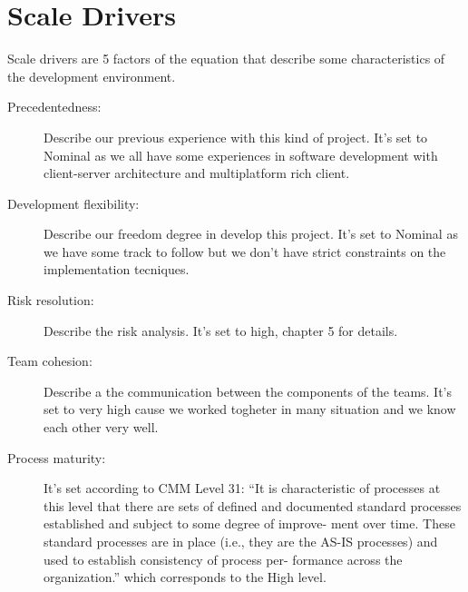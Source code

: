 \section{Scale Drivers}

Scale drivers are 5 factors of the equation that describe some 
characteristics of the development environment.

\begin{description}

    \item[Precedentedness:] Describe our previous experience with this kind of project. It's set to Nominal as we all have some experiences in software development with client-server architecture and multiplatform rich client.

    \item[Development flexibility:] Describe our freedom degree in develop this project. It's set to Nominal as we have some track to follow but we don't have strict constraints on the implementation tecniques.

    \item[Risk resolution:] Describe the risk analysis. It's set to high, chapter 5 for details.

    \item[Team cohesion:] Describe a the communication between the components of the teams. It's set to very high cause we worked togheter in many situation and we know each other very well.

    \item[Process maturity:] It's set according to CMM Level 31: “It is characteristic of processes at this level that there are sets of defined and documented standard processes established and subject to some degree of improve- ment over time. These standard processes are in place (i.e., they are the AS-IS processes) and used to establish consistency of process per- formance across the organization.” which corresponds to the High level.

\end{description}

